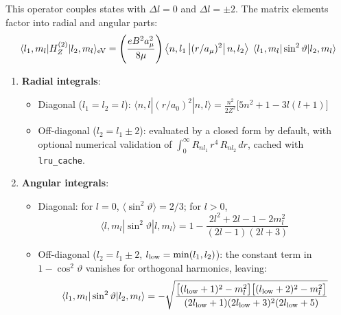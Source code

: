\documentclass[11pt,a4paper]{article}
\numberwithin{equation}{section}
\begin{document}
This operator couples states with $\Delta l = 0$ and $\Delta l = \pm 2$. The matrix elements factor into radial and angular parts:
\begin{equation}
\label{eq:qz_reduced}
\langle l_1, m_l | H_Z^{(2)} | l_2, m_l \rangle_{\rm eV}
= \left(\frac{e B^2 a_\mu^2}{8\mu}\right)
  \left\langle n, l_1 \left| (r/a_\mu)^2 \right| n, l_2 \right\rangle\;
  \langle l_1, m_l | \sin^2\vartheta | l_2, m_l \rangle
\end{equation}
\begin{enumerate}
    \item \textbf{Radial integrals}:
    \begin{itemize}
        \item Diagonal ($l_1 = l_2 = l$):
        $\displaystyle\langle n, l | (r/a_0)^2 | n, l \rangle = \frac{n^2}{2Z^2}\bigl[5n^2+1-3l(l+1)\bigr]$
        \item Off-diagonal ($l_2 = l_1 \pm 2$): evaluated by a closed form by default, with optional numerical validation of $\int_0^\infty R_{nl_1}\,r^4\,R_{nl_2}\,dr$, cached with \texttt{lru\_cache}.
    \end{itemize}
    \item \textbf{Angular integrals}:
    \begin{itemize}
        \item Diagonal: for $l=0$, $\langle\sin^2\vartheta\rangle = 2/3$; for $l>0$,
        \begin{equation}
        \langle l, m_l | \sin^2\vartheta | l, m_l \rangle
        = 1 - \frac{2l^2 + 2l - 1 - 2m_l^2}{(2l-1)(2l+3)}
        \end{equation}
        \item Off-diagonal ($l_2 = l_1 \pm 2$, $l_{\rm low} = \min(l_1,l_2)$): the constant term in $1 - \cos^2\vartheta$ vanishes for orthogonal harmonics, leaving:
        \begin{equation}
        \langle l_1, m_l | \sin^2\vartheta | l_2, m_l \rangle
        = -\sqrt{\frac{\bigl[(l_{\rm low}+1)^2 - m_l^2\bigr]
                       \bigl[(l_{\rm low}+2)^2 - m_l^2\bigr]}
                      {(2l_{\rm low}+1)(2l_{\rm low}+3)^2(2l_{\rm low}+5)}}
        \end{equation}
    \end{itemize}
\end{enumerate}
\end{document}
